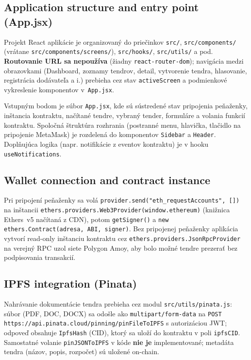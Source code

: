 \subsection{Application structure and entry point (App.jsx)}

Projekt React aplikácie je organizovaný do priečinkov \texttt{src/},
\texttt{src/components/} (vrátane \texttt{src/components/screens/}),
\texttt{src/hooks/}, \texttt{src/utils/} a pod. \textbf{Routovanie URL sa
nepoužíva} (žiadny \texttt{react-router-dom}); navigácia medzi obrazovkami
(Dashboard, zoznamy tendrov, detail, vytvorenie tendra, hlasovanie, registrácia
dodávateľa a i.) prebieha cez stav \texttt{activeScreen} a podmienkové vykreslenie
komponentov v~\texttt{App.jsx}.

Vstupným bodom je súbor \texttt{App.jsx}, kde sú sústredené stav pripojenia
peňaženky, inštancia kontraktu, načítané tendre, vybraný tender, formuláre a
volania funkcií kontraktu. Spoločná štruktúra rozhrania (postranné menu,
hlavička, tlačidlo na pripojenie MetaMask) je rozdelená do komponentov
\texttt{Sidebar} a \texttt{Header}. Doplňujúca logika (napr. notifikácie z
eventov kontraktu) je v hooku \texttt{useNotifications}.

\subsection{Wallet connection and contract instance}

Pri pripojení peňaženky sa volá \texttt{provider.send("eth\_requestAccounts", [])}
na inštancii \texttt{ethers.providers.Web3Provider(window.ethereum)} (knižnica
Ethers~v5 načítaná z CDN), potom \texttt{getSigner()} a
\texttt{new ethers.Contract(adresa, ABI, signer)}. Bez pripojenej peňaženky
aplikácia vytvorí read-only inštanciu kontraktu cez
\texttt{ethers.providers.JsonRpcProvider} na verejný RPC uzol siete Polygon Amoy,
aby bolo možné tendre prezerať bez podpisovania transakcií.

\subsection{IPFS integration (Pinata)}

Nahrávanie dokumentácie tendra prebieha cez modul \texttt{src/utils/pinata.js}:
súbor (PDF, DOC, DOCX) sa odošle ako \texttt{multipart/form-data} na
\texttt{POST https://api.pinata.cloud/pinning/pinFileToIPFS} s autorizáciou JWT;
odpoveď obsahuje \texttt{IpfsHash} (CID), ktorý sa uloží do kontraktu v poli
\texttt{ipfsCID}. Samostatné volanie \texttt{pinJSONToIPFS} v kóde \textbf{nie je}
implementované; metadáta tendra (názov, popis, rozpočet) sú uložené on-chain.

